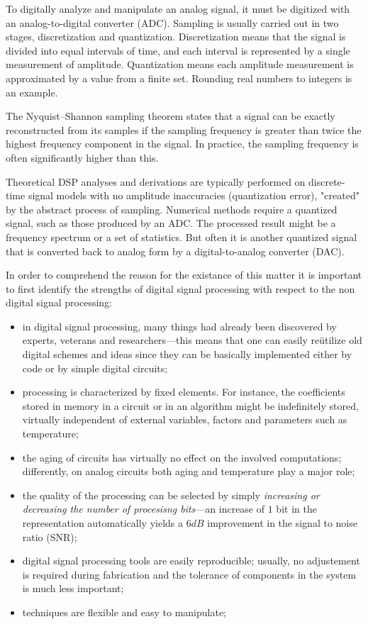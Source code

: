 \documentclass[\documentfontsize, twocolumn]{\classname}
\begin{document}
To digitally analyze and manipulate an analog signal, it must be digitized with an analog-to-digital converter (ADC). Sampling is usually carried out in two stages, discretization and quantization. Discretization means that the signal is divided into equal intervals of time, and each interval is represented by a single measurement of amplitude. Quantization means each amplitude measurement is approximated by a value from a finite set. Rounding real numbers to integers is an example.

The Nyquist–Shannon sampling theorem states that a signal can be exactly reconstructed from its samples if the sampling frequency is greater than twice the highest frequency component in the signal. In practice, the sampling frequency is often significantly higher than this.

Theoretical DSP analyses and derivations are typically performed on discrete-time signal models with no amplitude inaccuracies (quantization error), "created" by the abstract process of sampling. Numerical methods require a quantized signal, such as those produced by an ADC. The processed result might be a frequency spectrum or a set of statistics. But often it is another quantized signal that is converted back to analog form by a digital-to-analog converter (DAC)\cite{bib:wikiDSP}.

In order to comprehend the reason for the existance of this matter it is important to first identify the strengths of digital signal processing with respect to the non digital signal processing:
\begin{itemize}
    \item in digital signal processing, many things had already been discovered by experts, veterans and researchers---this means that one can easily re\"utilize old digital schemes and ideas since they can be basically implemented either by code or by simple digital circuits;
    \item processing is characterized by fixed elements. For instance, the coefficients stored in memory in a circuit or in an algorithm might be indefinitely stored, virtually independent of external variables, factors and parameters such as temperature;
    \item the aging of circuits has virtually no effect on the involved computations; differently, on analog circuits both aging and temperature play a major role;
    \item the quality of the processing can be selected by simply \emph{increasing or decreasing the number of procesisng bits}---an increase of $1$ bit in the representation automatically yields a $6 dB$ improvement in the signal to noise ratio (SNR);
    \item digital signal processing tools are easily reproducible; usually, no adjustement is required during fabrication and the tolerance of components in the system is much less important;
    \item techniques are flexible and easy to manipulate;
\end{itemize}
\end{document}

